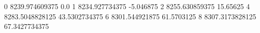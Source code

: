 0 8239.974609375 0.0
1 8234.927734375 -5.046875
2 8255.630859375 15.65625
4 8283.5048828125 43.5302734375
6 8301.544921875 61.5703125
8 8307.3173828125 67.3427734375
